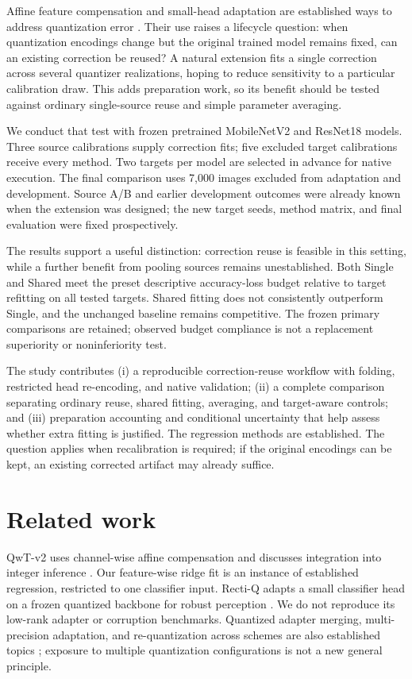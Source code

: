 \documentclass[10pt,twocolumn]{article}
\begin{document}
Affine feature compensation and small-head adaptation are established ways to address quantization error \citep{tang2025qwt,araghi2026recti}. Their use raises a lifecycle question: when quantization encodings change but the original trained model remains fixed, can an existing correction be reused? A natural extension fits a single correction across several quantizer realizations, hoping to reduce sensitivity to a particular calibration draw. This adds preparation work, so its benefit should be tested against ordinary single-source reuse and simple parameter averaging.

We conduct that test with frozen pretrained MobileNetV2 and ResNet18 models. Three source calibrations supply correction fits; five excluded target calibrations receive every method. Two targets per model are selected in advance for native execution. The final comparison uses 7,000 images excluded from adaptation and development. Source A/B and earlier development outcomes were already known when the extension was designed; the new target seeds, method matrix, and final evaluation were fixed prospectively.

The results support a useful distinction: correction reuse is feasible in this setting, while a further benefit from pooling sources remains unestablished. Both Single and Shared meet the preset descriptive accuracy-loss budget relative to target refitting on all tested targets. Shared fitting does not consistently outperform Single, and the unchanged baseline remains competitive. The frozen primary comparisons are retained; observed budget compliance is not a replacement superiority or noninferiority test.

The study contributes (i) a reproducible correction-reuse workflow with folding, restricted head re-encoding, and native validation; (ii) a complete comparison separating ordinary reuse, shared fitting, averaging, and target-aware controls; and (iii) preparation accounting and conditional uncertainty that help assess whether extra fitting is justified. The regression methods are established. The question applies when recalibration is required; if the original encodings can be kept, an existing corrected artifact may already suffice.

\section{Related work}
QwT-v2 uses channel-wise affine compensation and discusses integration into integer inference \citep{tang2025qwt}. Our feature-wise ridge fit is an instance of established regression, restricted to one classifier input. Recti-Q adapts a small classifier head on a frozen quantized backbone for robust perception \citep{araghi2026recti}. We do not reproduce its low-rank adapter or corruption benchmarks. Quantized adapter merging, multi-precision adaptation, and re-quantization across schemes are also established topics \citep{li2026scale,xu2026quept,manohara2023mrq}; exposure to multiple quantization configurations is not a new general principle.
\end{document}
